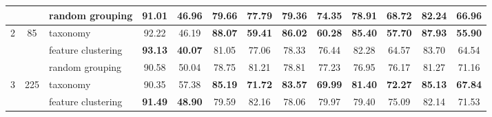 \documentclass[final]{cvpr}
\begin{document}
\begin{table*}[t]
{\begin{tabular}{c|c|l|cc|cc|cc|cc|cc}
                                &                                                                                        & random grouping                                                                                             & 91.01                & 46.96                 & 79.66                & 77.79                 & 79.36                & 74.35                 & 78.91                & 68.72                 & 82.24                & 66.96                \\ \midrule
\multirow{3}{*}{2}              & \multirow{3}{*}{85}                                                                    & taxonomy                                                                                                    & 92.22                & 46.19                 & \textbf{88.07}       & \textbf{59.41}        & \textbf{86.02}       & \textbf{60.28}        & \textbf{85.40}       & \textbf{57.70}        & \textbf{87.93}       & \textbf{55.90}       \\
                                &                                                                                        & feature clustering                                                                                          & \textbf{93.13}       & \textbf{40.07}        & 81.05                & 77.06                 & 78.33                & 76.44                 & 82.28                & 64.57                 & 83.70                & 64.54                \\
                                &                                                                                        & random grouping                                                                                             & 90.58                & 50.04                 & 78.75                & 81.21                 & 78.81                & 77.23                 & 76.95                & 76.17                 & 81.27                & 71.16                \\ \midrule
\multirow{3}{*}{3}              & \multirow{3}{*}{225}                                                                   & taxonomy                                                                                                    & 90.35                & 57.38                 & \textbf{85.19}       & \textbf{71.72}        & \textbf{83.57}       & \textbf{69.99}        & \textbf{81.40}       & \textbf{72.27}        & \textbf{85.13}       & \textbf{67.84}       \\
                                &                                                                                        & feature clustering                                                                                          & \textbf{91.49}       & \textbf{48.90}        & 79.59                & 82.16                 & 78.06                & 79.97                 & 79.40                & 75.09                 & 82.14                & 71.53                \\

\end{tabular}}
\end{table*}
\end{document}
